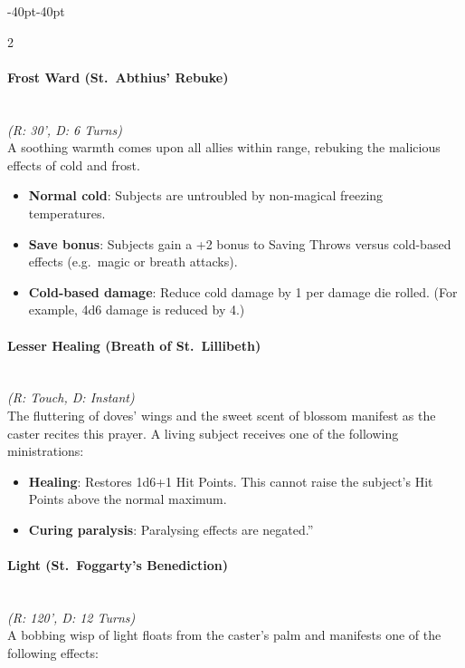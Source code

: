 \documentclass{book}
\providecommand{\tightlist}{%
\setlength{\itemsep}{0pt}\setlength{\parskip}{0pt}}
\begin{document}
\begin{adjustwidth}{-40pt}{-40pt}
\begin{multicols}{2}
\paragraph{Frost Ward (St.~Abthius'
	Rebuke)}\label{frost-ward-st.-abthius-rebuke}\mbox{}\\
\emph{(R: 30', D: 6 Turns)}\\
A soothing warmth comes upon all allies within range, rebuking the
malicious effects of cold and frost.

\begin{itemize}
	\tightlist
	\item
	\textbf{Normal cold}: Subjects are untroubled by non-magical freezing
	temperatures.
	\item
	\textbf{Save bonus}: Subjects gain a +2 bonus to Saving Throws versus
	cold-based effects (e.g.~magic or breath attacks).
	\item
	\textbf{Cold-based damage}: Reduce cold damage by 1 per damage die
	rolled. (For example, 4d6 damage is reduced by 4.)
\end{itemize}

\paragraph{Lesser Healing (Breath of
	St.~Lillibeth)}\label{lesser-healing-breath-of-st.-lillibeth}\mbox{}\\
\emph{(R: Touch, D: Instant)}\\
The fluttering of doves' wings and the sweet scent of blossom manifest
as the caster recites this prayer. A living subject receives one of the
following ministrations:

\begin{itemize}
	\tightlist
	\item
	\textbf{Healing}: Restores 1d6+1 Hit Points. This cannot raise the
	subject's Hit Points above the normal maximum.
	\item
	\textbf{Curing paralysis}: Paralysing effects are negated.''
\end{itemize}

\paragraph{Light (St.~Foggarty's
	Benediction)}\label{light-st.-foggartys-benediction}\mbox{}\\
\emph{(R: 120', D: 12 Turns)}\\
A bobbing wisp of light floats from the caster's palm and manifests one
of the following effects:


\end{multicols}
\end{adjustwidth}
\end{document}
